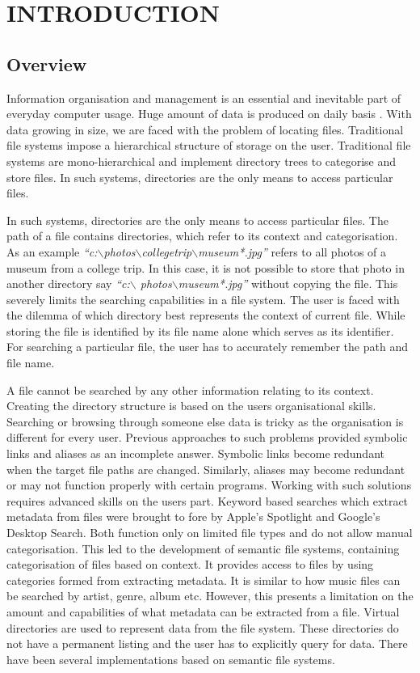 \chapter{INTRODUCTION}
\section{Overview}

Information organisation \cite{FUSE} and management is an essential and inevitable part of everyday computer usage. Huge amount of data is produced on daily basis \cite{GOOGLEDESKTOP}. With data growing in size, we are faced with the problem of locating files. Traditional file systems impose a  hierarchical structure of storage on the user. Traditional file systems are mono-hierarchical and implement directory trees to categorise and store files. In such systems, directories are the only means to access particular files.

In such systems, directories are the only means to access particular files. The path of a file contains directories, which refer to its context and categorisation. As an example \textit{``c:$\backslash$photos$\backslash$collegetrip$\backslash$museum*.jpg''} refers to all photos of a museum from a college trip. In this case, it is not possible to store that photo in another directory say \textit{``c:$\backslash$ photos$\backslash$museum*.jpg''} without copying the file. This severely limits the searching capabilities in a file system. The user is faced with the dilemma of which directory best represents the context of current file. While storing the file is identified by its file name alone which serves as its identifier. For searching a particular file, the user has to accurately remember the path and file name.

A file cannot be searched by any other information relating to its context. Creating the directory structure is based on the users organisational skills. Searching or browsing through someone else data is tricky as the organisation is different for every user. Previous approaches to such problems provided symbolic links and aliases as an incomplete answer. Symbolic links become redundant when the target file paths are changed. Similarly, aliases may become redundant or may not function properly with certain programs. Working with such solutions requires advanced skills on the users part. Keyword based searches which extract metadata from files were brought to fore by Apple's Spotlight and Google's Desktop Search. Both function only on limited file types and do not allow manual categorisation. This led to the development of semantic file systems, containing categorisation of files based on context. It provides access to files by using categories formed from extracting metadata. It is similar to how music files can be searched by artist, genre, album etc. However, this presents a limitation on the amount and capabilities of what metadata can be extracted from a file. Virtual directories are used to represent data from the file system. These directories do not have a permanent listing and the user has to explicitly query for data. There have been several implementations based on semantic file systems.

